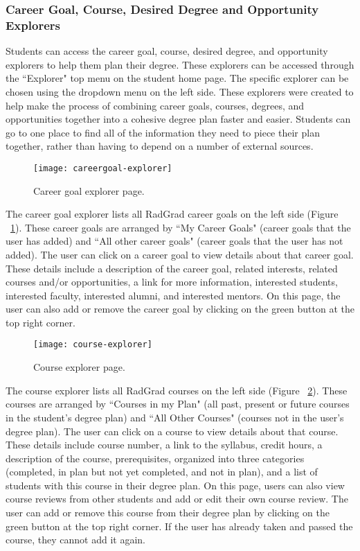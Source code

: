 \subsubsection{Career Goal, Course, Desired Degree and Opportunity Explorers}

Students can access the career goal, course, desired degree, and opportunity explorers to help them plan their degree.  These explorers can be accessed through the ``Explorer" top menu on the student home page. The specific explorer can be chosen using the dropdown menu on the left side. These explorers were created to help make the process of combining career goals, courses, degrees, and opportunities together into a cohesive degree plan faster and easier. Students can go to one place to find all of the information they need to piece their plan together, rather than having to depend on a number of external sources.

\begin{figure}[htbp!]
\centering
\texttt{[image: careergoal-explorer]}
\caption{Career goal explorer page.}
\label{career-goal-explorer}
\end{figure}

The career goal explorer lists all RadGrad career goals on the left side (Figure ~\ref{career-goal-explorer}). These career goals are arranged by ``My Career Goals" (career goals that the user has added) and ``All other career goals" (career goals that the user has not added). The user can click on a career goal to view details about that career goal. These details include a description of the career goal, related interests, related courses and/or opportunities, a link for more information, interested students, interested faculty, interested alumni, and interested mentors. On this page, the user can also add or remove the career goal by clicking on the green button at the top right corner.  

\begin{figure}[htbp!]
\centering
\texttt{[image: course-explorer]}
\caption{Course explorer page.}
\label{course-explorer}
\end{figure}

The course explorer lists all RadGrad courses on the left side (Figure ~\ref{course-explorer}). These courses are arranged by ``Courses in my Plan" (all past, present or future courses in the student's degree plan) and ``All Other Courses" (courses not in the user's degree plan). The user can click on a course to view details about that course. These details include course number, a link to the syllabus, credit hours, a description of the course, prerequisites, organized into three categories (completed, in plan but not yet completed, and not in plan), and a list of students with this course in their degree plan. On this page, users can also view course reviews from other students and add or edit their own course review. The user can add or remove this course from their degree plan by clicking on the green button at the top right corner. If the user has already taken and passed the course, they cannot add it again.

